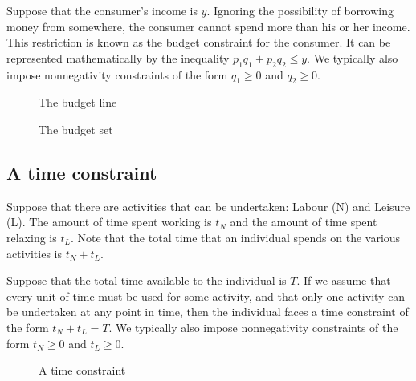\documentclass[letterpaper,10pt,english]{jupyterBook}
\begin{document}
\sphinxAtStartPar
Suppose that the consumer’s income is \(y\). Ignoring the possibility of borrowing money from somewhere, the consumer cannot spend more than his or her income. This restriction is known as the budget constraint for the consumer. It can be
represented mathematically by the inequality \(p_1 q_1 + p_2 q_2 \leqslant y\). We typically also impose non\sphinxhyphen{}negativity constraints of the form \(q_1 \geqslant 0\) and \(q_2 \geqslant 0\).

\begin{figure}[htbp]
\centering
\capstart

\noindent{}
\caption{The budget line}\label{\detokenize{01.intro_to_economics:id1}}\end{figure}

\begin{figure}[htbp]
\centering
\capstart

\noindent{}
\caption{The budget set}\label{\detokenize{01.intro_to_economics:id2}}\end{figure}


\subsection{A time constraint}
\label{\detokenize{01.intro_to_economics:a-time-constraint}}
\sphinxAtStartPar
Suppose that there are activities that can be undertaken: Labour (N) and Leisure (L).  The amount of time spent working is \(t_N\) and the amount of time spent relaxing is \(t_L\).  Note that the total time that an individual spends on the various activities is \(t_N + t_L\).

\sphinxAtStartPar
Suppose that the total time available to the individual is \(T\). If we assume that every unit of time must be used for some activity, and that only one activity can be undertaken at any point in time, then the individual faces a time constraint of the form \(t_N + t_L = T\). We typically also impose non\sphinxhyphen{}negativity constraints of the form \(t_N \geqslant 0\) and \(t_L \geqslant 0\).

\begin{figure}[htbp]
\centering
\capstart

\noindent{}
\caption{A time constraint}\label{\detokenize{01.intro_to_economics:id3}}\end{figure}
\end{document}
